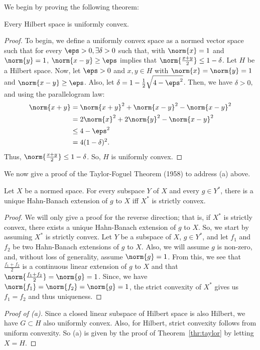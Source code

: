 \documentclass[12pt,letterpaper,twoside]{hmcpset}
\begin{document}
\begin{solution}
  We begin by proving the following theorem:
  \begin{thm}
    \label{thr:2}
    Every Hilbert space is uniformly convex.
  \end{thm}
  \begin{proof}
    To begin, we define a uniformly convex space as a normed vector space such that for every $\eps > 0, \exists \delta > 0$ such that, with $\norm{x} = 1$ and $\norm{y} = 1$, $\norm{x -y} \geq \eps$ implies that $\norm{\frac{x+y}{2}} \leq 1 - \delta$.
    Let $H$ be a Hilbert space.
    Now, let $\eps > 0$ and $x,y \in H$ with $\norm{x} = \norm{y} = 1$ and $\norm{x - y} \geq \eps$.
    Also, let $\delta = 1 - \frac{1}{2}\sqrt{4 - \eps^2}$.
    Then, we have $\delta > 0$, and using the parallelogram law:
    \begin{align*}
      \norm{x + y} &= \norm{x +y}^2 + \norm{x - y}^2 - \norm{x - y}^2 \\
      {} &= 2\norm{x}^2 + 2\norm{y}^2 - \norm{x - y}^2 \\
      {} &\leq 4 - \eps^2 \\
      {} &= 4(1-\delta)^2.
    \end{align*}
    Thus, $\norm{\frac{x+y}{2}} \leq 1 - \delta$.
    So, $H$ is uniformly convex.
  \end{proof}
  We now give a proof of the Taylor-Foguel Theorem (1958) to address (a) above.
  \begin{thm}
    \label{thr:taylor}
    Let $X$ be a normed space. For every subspace $Y$ of $X$ and every $g \in Y^*$, there is a unique Hahn-Banach extension of $g$ to $X$ iff $X^*$ is strictly convex.
  \end{thm}
  \begin{proof}
    We will only give a proof for the reverse direction; that is, if $X^*$ is strictly convex, there exists a unique Hahn-Banach extension of $g$ to $X$.
    So, we start by assuming $X^*$ is strictly convex.  Let $Y$ be a subspace of $X$, $g \in Y^*$, and let $f_1$ and $f_2$ be two Hahn-Banach extensions of $g$ to $X$.
    Also, we will assume $g$ is non-zero, and, without loss of generality, assume $\norm{g} = 1$.
    From this, we see that $\frac{f_1 + f_2}{2}$ is a continuous linear extension of $g$ to $X$ and that $\norm{\frac{f_1 + f_2}{2}} = \norm{g} = 1$.
    Since, we have $\norm{f_1} = \norm{f_2} = \norm{g} = 1$, the strict convexity of $X^*$ gives us $f_1 = f_2$ and thus uniqueness.
  \end{proof}
  
  \begin{proof}[Proof of (a)]
    Since a closed linear subspace of Hilbert space is also Hilbert, we have $G \subset H$ also uniformly convex.
    Also, for Hilbert, strict convexity follows from uniform convexity.
    So (a) is given by the proof of Theorem~\ref{thr:taylor} by letting $X = H$.
  \end{proof}
\end{solution}
\end{document}
